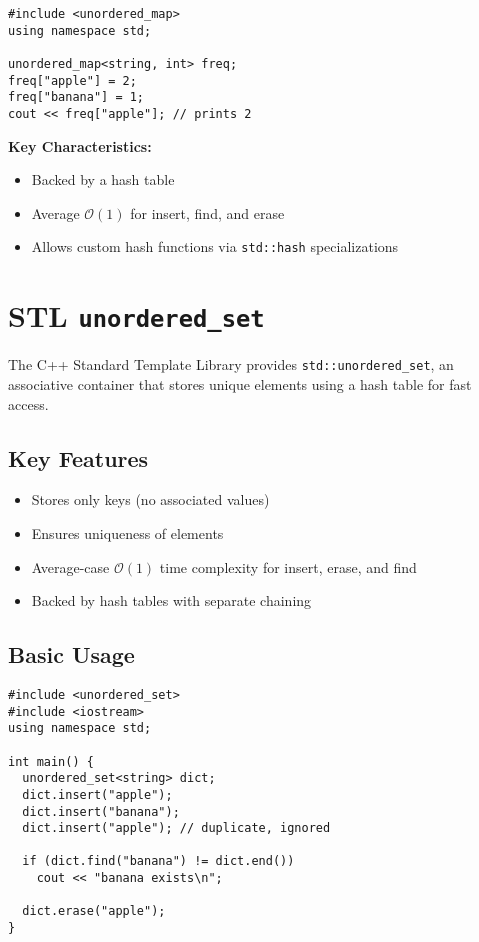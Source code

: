 \documentclass{article}
\begin{document}
\begin{lstlisting}[style=cppstyle]
#include <unordered_map>
using namespace std;

unordered_map<string, int> freq;
freq["apple"] = 2;
freq["banana"] = 1;
cout << freq["apple"]; // prints 2
\end{lstlisting}

\textbf{Key Characteristics:}
\begin{itemize}
  \item Backed by a hash table
  \item Average $\mathcal{O}(1)$ for insert, find, and erase
  \item Allows custom hash functions via \texttt{std::hash} specializations
\end{itemize}

\section{STL \texttt{unordered\_set}}

The C++ Standard Template Library provides \texttt{std::unordered\_set}, an associative container that stores unique elements using a hash table for fast access.

\subsection{Key Features}

\begin{itemize}
  \item Stores only keys (no associated values)
  \item Ensures uniqueness of elements
  \item Average-case $\mathcal{O}(1)$ time complexity for insert, erase, and find
  \item Backed by hash tables with separate chaining
\end{itemize}

\subsection{Basic Usage}

\begin{lstlisting}[style=cppstyle]
#include <unordered_set>
#include <iostream>
using namespace std;

int main() {
  unordered_set<string> dict;
  dict.insert("apple");
  dict.insert("banana");
  dict.insert("apple"); // duplicate, ignored

  if (dict.find("banana") != dict.end())
    cout << "banana exists\n";

  dict.erase("apple");
}
\end{lstlisting}
\end{document}
